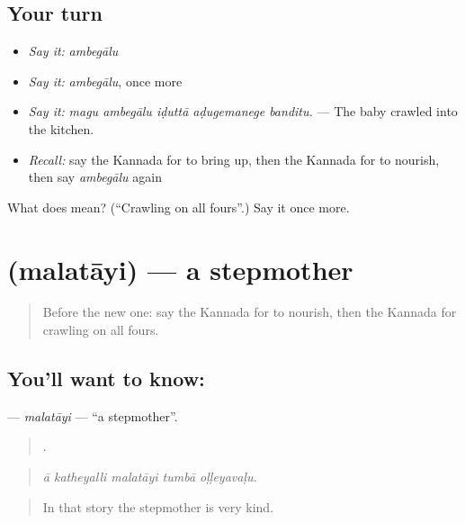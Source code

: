 \subsection*{Your turn}
\begin{itemize}
\raggedright
  \item \emph{Say it:} \emph{ambegālu}
  \item \emph{Say it:} \emph{ambegālu}, once more
  \item \emph{Say it:} \emph{magu ambegālu iḍuttā aḍugemanege banditu.} — The baby crawled into the kitchen.
  \item \emph{Recall:} say the Kannada for to bring up, then the Kannada for to nourish, then say \emph{ambegālu} again
\end{itemize}

\begin{tcolorbox}[breakable,colback=teal!4,colframe=teal!35!black,title={Before you move on}]
What does  mean? (\textquotedblleft{}Crawling on all fours\textquotedblright{}.) Say it once more.
\end{tcolorbox}
\section[\texorpdfstring{\kn{ಮಲತಾಯಿ} (malatāyi)}{ಮಲತಾಯಿ (malatāyi)}]{ (malatāyi) — a stepmother}

\label{lesson:KA-C527-malatayi}



\begin{quote}
Before the new one: say the Kannada for to nourish, then the Kannada for crawling on all fours.
\end{quote}

\subsection*{You'll want to know: }
\textbf{} — \emph{malatāyi} — \textquotedblleft{}a stepmother\textquotedblright{}.

\begin{quote}
    .
\end{quote}

\begin{quote}
\emph{ā katheyalli malatāyi tumbā oḷḷeyavaḷu.}
\end{quote}

\begin{quote}
In that story the stepmother is very kind.
\end{quote}

